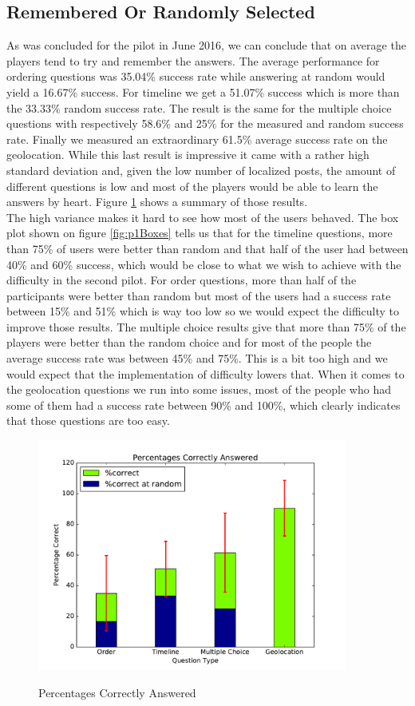 \subsection{Remembered Or Randomly Selected}
As was concluded for the pilot in June 2016, we can conclude that on average the players tend to try and remember the answers. The average performance for ordering questions was 35.04\% success rate while answering at random would yield a 16.67\% success. For timeline we get a 51.07\% success which is more than the 33.33\% random success rate. The result is the same for the multiple choice questions with respectively 58.6\% and 25\% for the measured and random success rate. Finally we measured an extraordinary 61.5\% average success rate on the geolocation. While this last result is impressive it came with a rather high standard deviation and, given the low number of localized posts, the amount of different questions is low and most of the players would be able to learn the answers by heart. Figure \ref{fig:p1Correct} shows a summary of those results.\\
The high variance makes it hard to see how most of the users behaved. The box plot shown on figure \ref{fig:p1Boxes} tells us that for the timeline questions, more than 75\% of users were better than random and that half of the user had between 40\% and 60\% success, which would be close to what we wish to achieve with the difficulty in the second pilot. For order questions, more than half of the participants were better than random but most of the users had a success rate between 15\% and 51\% which is way too low so we would expect the difficulty to improve those results. The multiple choice results give that more than 75\% of the players were better than the random choice and for most of the people the average success rate was between 45\% and 75\%. This is a bit too high and we would expect that the implementation of difficulty lowers that. When it comes to the geolocation questions we run into some issues, most of the people who had some of them had a success rate between 90\% and 100\%, which clearly indicates that those questions are too easy.
\begin{figure}
\centering
{\includegraphics[width=4in]{images/pilot_1_correct.pdf}}
\caption{Percentages Correctly Answered}
\label{fig:p1Correct}
\end{figure}
